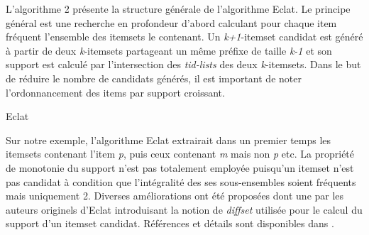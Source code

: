 \documentclass[a4paper,10pt]{report}
\begin{document}
L'algorithme 2 présente la structure générale de l'algorithme Eclat. Le principe général est une recherche en profondeur d'abord calculant pour chaque item fréquent l'ensemble des itemsets le contenant. Un \emph{k+1}-itemset candidat est généré à partir de deux \emph{k}-itemsets partageant un même préfixe de taille \emph{k-1} et son support est calculé par l'intersection des \emph{tid-lists} des deux \emph{k}-itemsets. Dans le but de réduire le nombre de candidats générés, il est important de noter l'ordonnancement des items par support croissant.

\begin{algorithm}[H]
\caption{Eclat}

\end{algorithm}

Sur notre exemple, l'algorithme Eclat extrairait dans un premier temps les itemsets contenant l'item \emph{p}, puis ceux contenant \emph{m} mais non \emph{p} etc. La propriété de monotonie du support n'est pas totalement employée puisqu'un itemset n'est pas candidat à condition que l'intégralité des ses sous-ensembles soient fréquents mais uniquement 2. Diverses améliorations ont été proposées dont une par les auteurs originels d'Eclat introduisant la notion de \emph{diffset} utilisée pour le calcul du support d'un itemset candidat. Références et détails sont disponibles dans \cite{GOE}. \\
\end{document}
